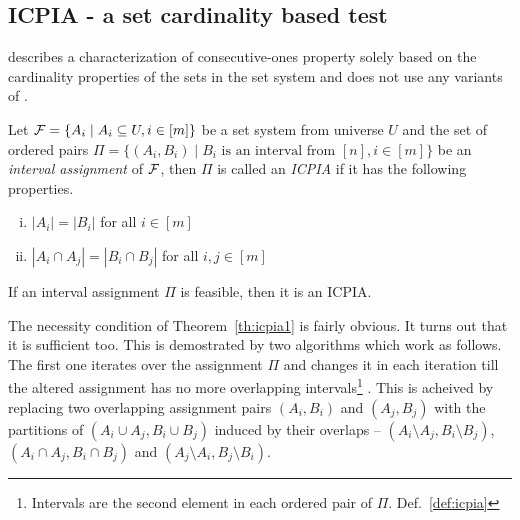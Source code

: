 


\subsection{ICPIA - a set cardinality based \COP test}


\cite{nsnrs09} describes a characterization of consecutive-ones
property solely based on the cardinality properties of the sets in the
set system and does not use any variants of \PQtrees. 

\begin{definition}
  \label{def:icpia}
  Let ${\cal F} = \{A_i \mid A_i \subseteq U, i \in [m]\}$ be a set system
  from universe $U$ and the set of ordered pairs $\Pi = \{(A_i, B_i)
  \mid B_i  \text{ is an interval from } [n], i \in [m]\}$ be an {\em interval
    assignment} of ${\cal F}$, then $\Pi$ is called an {\em ICPIA} if it has
  the following properties.
  \begin{enumerate}[i.]
  \item $|A_i| = |B_i|$ for all $i \in [m]$
  \item $|A_i \cap A_j| = |B_i \cap B_j|$ for all $i, j \in [m]$
  \end{enumerate}
\end{definition}

\begin{theoremsansproof}
  \label{th:icpia1}
  If an interval assignment $\Pi$ is feasible, then it is an ICPIA.
\end{theoremsansproof}

The necessity condition of Theorem~\ref{th:icpia1} is fairly
obvious. It turns out that it is sufficient too.  This is demostrated
by two algorithms which work as follows. The first one iterates over
the assignment $\Pi$ %
and changes it in each iteration till the altered
assignment %
has no more overlapping intervals\footnote{Intervals are the second
  element in each ordered pair of $\Pi$. Def.~\ref{def:icpia}} %
\cite[Alg.~1]{nsnrs09}. This is acheived by replacing two overlapping
assignment pairs $(A_i, B_i)$ and $(A_j, B_j)$ with the partitions of
$(A_i \cup A_j,B_i \cup B_j)$ induced by their overlaps -- $(A_i
\setminus A_j, B_i \setminus B_j)$, $(A_i \cap A_j, B_i \cap B_j)$ and
$(A_j \setminus A_i, B_j \setminus B_i)$.

